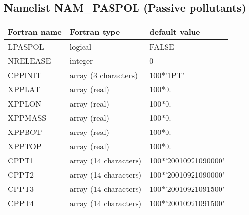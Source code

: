 \subsection{Namelist NAM\_PASPOL (Passive pollutants)}
\begin{center}
\begin{tabular}{|l|l|l| }
\hline 
 Fortran name  & Fortran type  & default value \\
\hline
 LPASPOL       & logical       & FALSE         \\
 NRELEASE      & integer       & 0             \\
 CPPINIT       & array (3 characters)& 100*'1PT'\\
 XPPLAT        & array (real)  & 100*0.   \\
 XPPLON        & array (real)  & 100*0.   \\
 XPPMASS       & array (real)  & 100*0.   \\
 XPPBOT        & array (real)  & 100*0.   \\
 XPPTOP        & array (real)  & 100*0.   \\
 CPPT1         & array (14 characters)& 100*'20010921090000'\\
 CPPT2         & array (14 characters)& 100*'20010921090000'\\
 CPPT3         & array (14 characters)& 100*'20010921091500'\\
 CPPT4         & array (14 characters)& 100*'20010921091500'\\
\hline
\end{tabular}
\end{center}

